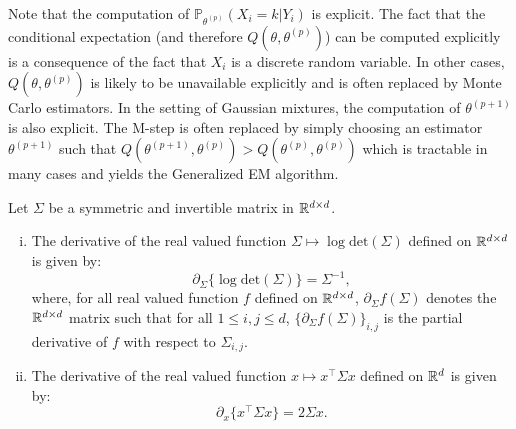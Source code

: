 \documentclass[english,graybox,envcountchap,envcountsame,sectrefs,shortlabels]{svmono}
\theoremstyle{style}
\newcommand{\eqsp}{}
\begin{document}
\begin{remark}
Note that the computation of $\mathbb{P}_{\theta^{(p)}}(X_i = k|Y_i) $ is explicit. The fact that the conditional expectation (and therefore $Q(\theta,\theta^{(p)})$) can be computed explicitly is a consequence of the fact that $X_i$ is a discrete random variable. In other cases, $Q(\theta,\theta^{(p)})$ is likely to be unavailable explicitly and is often replaced by Monte Carlo estimators. In the setting of Gaussian mixtures, the computation of $\theta^{(p+1)}$ is also explicit. The M-step is often replaced by simply choosing an estimator $\theta^{(p+1)}$ such that $Q(\theta^{(p+1)},\theta^{(p)}) > Q(\theta^{(p)},\theta^{(p)})$  which is tractable in many cases and yields the Generalized EM algorithm.
\end{remark}

\begin{lemma}
\label{lem:matrix:calculus}
Let $\Sigma$ be a symmetric and invertible  matrix in $\mathbb{R}^{d\times d}$.
\begin{enumerate}[(i)]
\item The derivative of the real valued function $\Sigma \mapsto \log\mathrm{det}(\Sigma)$ defined on $\mathbb{R}^{d\times d}$ is given by:
\[
\partial_{\Sigma}\{\log\mathrm{det}(\Sigma)\}= \Sigma^{-1}\eqsp,
\]
where, for all real valued function $f$ defined on $\mathbb{R}^{d\times d}$, $\partial_{\Sigma}f(\Sigma)$ denotes the $\mathbb{R}^{d\times d}$ matrix such that for all $1\leqslant i,j\leqslant d$, $\{\partial_{\Sigma}f(\Sigma)\}_{i,j}$ is the partial derivative of $f$ with respect to $\Sigma_{i,j}$.
\item The derivative of the real valued  function  $x\mapsto x^\top\Sigma x$ defined on $\mathbb{R}^d$ is given by:
\[
\partial_{x}\{x^\top\Sigma x\} = 2 \Sigma x\eqsp.
\]
\end{enumerate}
\end{lemma}
\end{document}
